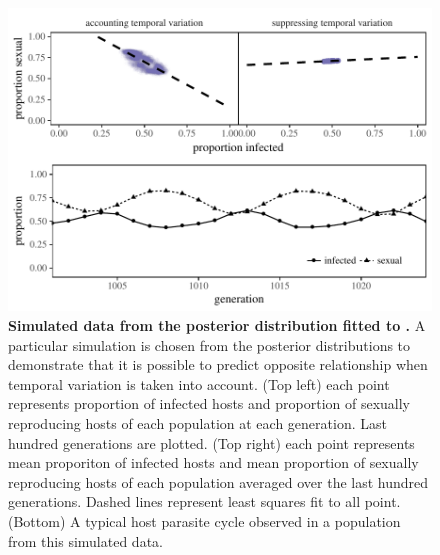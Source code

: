 \documentclass{article}\usepackage[]{graphicx}\usepackage[]{color}
\begin{document}
\begin{figure}[!ht]
\includegraphics[width=\textwidth]{../fig/cycle_example.pdf}
\caption{{\bf Simulated data from the posterior distribution fitted to \cite{vergara2014infection}.}
A particular simulation is chosen from the posterior distributions to demonstrate that it is possible to predict opposite relationship when temporal variation is taken into account. (Top left) each point represents proportion of infected hosts and proportion of sexually reproducing hosts of each population at each generation. Last hundred generations are plotted. (Top right) each point represents mean proporiton of infected hosts and mean proportion of sexually reproducing hosts of each population averaged over the last hundred generations. Dashed lines represent least squares fit to all point. (Bottom) A typical host parasite cycle observed in a population from this simulated data. %
}
\label{fig:cycle}
\end{figure}



\end{document}
